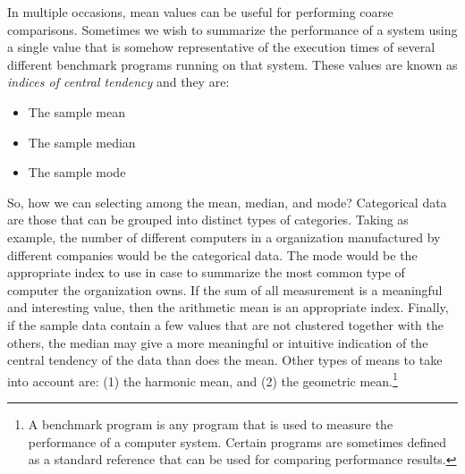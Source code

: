 \documentclass[openany, a4paper]{book}
\theoremstyle{plain}
\theoremstyle{definition}
\theoremstyle{remark}
\begin{document}
In multiple occasions, mean values can be useful for performing coarse
comparisons. Sometimes we wish to summarize the performance of a system using
a single value that is somehow representative of the execution times of
several different benchmark programs running on that system. These values are
known as \emph{indices of central tendency} and they are:

\begin{itemize}
\item The sample mean
\item The sample median
\item The sample mode
\end{itemize}

So, how we can selecting among the mean, median, and mode? Categorical data
are those that can be grouped into distinct types of categories. Taking as
example, the number of different computers in a organization manufactured by
different companies would be the categorical data. The mode would be the
appropriate index to use in case to summarize the most common type of
computer the organization owns. If the sum of all measurement is a meaningful
and interesting value, then the arithmetic mean is an appropriate
index. Finally, if the sample data contain a few values that are not
clustered together with the others, the median may give a more meaningful or
intuitive indication of the central tendency of the data than does the
mean. Other types of means to take into account are: (1) the harmonic mean,
and (2) the geometric mean.\footnote{A benchmark program is any program that is used to measure the
performance of a computer system. Certain programs are sometimes defined as a
standard reference that can be used for comparing performance results.}
\end{document}
